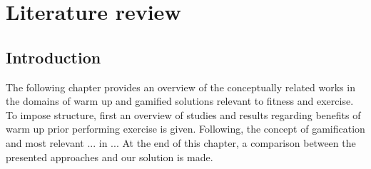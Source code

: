 \chapter{Literature review}\label{chapter:warmup}

\section{Introduction}

The following chapter provides an overview of the conceptually related works in the domains of warm up and gamified solutions relevant to fitness and exercise. 
To impose structure, first an overview of studies and results regarding benefits of warm up prior performing exercise is given. Following, the concept of gamification and most relevant ... in ... At the end of this chapter, a comparison between the presented approaches and our solution is made.

